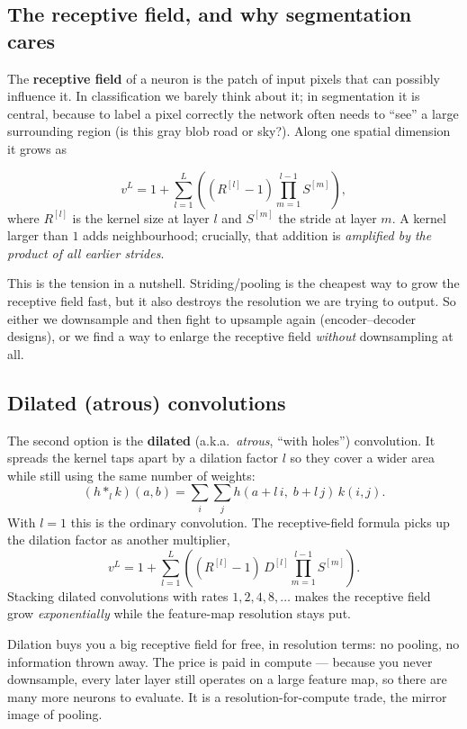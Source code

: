 \documentclass[11pt, oneside]{book}
\begin{document}
\subsection{The receptive field, and why segmentation cares}

The \textbf{receptive field} of a neuron is the patch of input pixels that can
possibly influence it. In classification we barely think about it; in
segmentation it is central, because to label a pixel correctly the network often
needs to ``see'' a large surrounding region (is this gray blob road or sky?).
Along one spatial dimension it grows as

\begin{thmbox}[title={Receptive-field growth}]
\[
  v^{L} = 1 + \sum_{l=1}^{L}\left( (R^{[l]}-1)\prod_{m=1}^{l-1} S^{[m]} \right),
\]
where $R^{[l]}$ is the kernel size at layer $l$ and $S^{[m]}$ the stride at
layer $m$. A kernel larger than $1$ adds neighbourhood; crucially, that addition
is \emph{amplified by the product of all earlier strides}.
\end{thmbox}

This is the tension in a nutshell. Striding/pooling is the cheapest way to grow
the receptive field fast, but it also destroys the resolution we are trying to
output. So either we downsample and then fight to upsample again (encoder--decoder
designs), or we find a way to enlarge the receptive field \emph{without}
downsampling at all.

\subsection{Dilated (atrous) convolutions}

The second option is the \textbf{dilated} (a.k.a.\ \emph{atrous}, ``with holes'')
convolution. It spreads the kernel taps apart by a dilation factor $l$ so they
cover a wider area while still using the same number of weights:
\[
  (h *_{l} k)(a,b) = \sum_{i}\sum_{j} h(a + l\,i,\; b + l\,j)\, k(i,j).
\]
With $l=1$ this is the ordinary convolution. The receptive-field formula picks up
the dilation factor as another multiplier,
\[
  v^{L} = 1 + \sum_{l=1}^{L}\left( (R^{[l]}-1)\,D^{[l]}\prod_{m=1}^{l-1} S^{[m]} \right).
\]
Stacking dilated convolutions with rates $1,2,4,8,\dots$ makes the receptive
field grow \emph{exponentially} while the feature-map resolution stays put.

\begin{intbox}
Dilation buys you a big receptive field for free, in resolution terms: no pooling,
no information thrown away. The price is paid in compute --- because you never
downsample, every later layer still operates on a large feature map, so there are
many more neurons to evaluate. It is a resolution-for-compute trade, the mirror
image of pooling.
\end{intbox}
\end{document}
